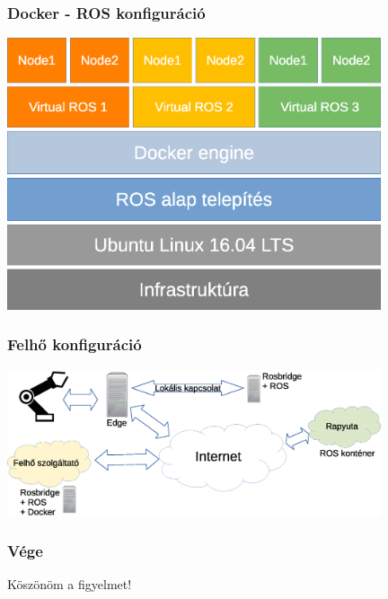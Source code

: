 \documentclass{beamer}
\begin{document}
\begin{frame} 
\frametitle{Docker - ROS konfiguráció}
	\includegraphics[width=11cm]{../feladat-architektura-ROS}
\end{frame}

\begin{frame} 
\frametitle{Felhő konfiguráció}
	\includegraphics[width=11cm]{../docker-architektura-Felho}
\end{frame}


\begin{frame} 
\frametitle{Vége}
\begin{center}
	{\Huge Köszönöm a figyelmet!}
\end{center}
\end{frame}
\end{document}
